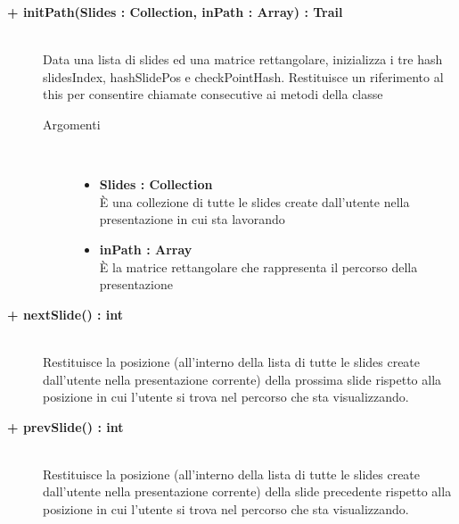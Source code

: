 \begin{description}
\begin{description}
\begin{description}
\begin{itemize}
				\end{itemize}
			
		\end{description}
	\end{description}
	
	\begin{description}
		\item[\textbf{\color{blue}+ initPath(Slides : Collection, inPath : Array) : Trail			}] \hfill \\
			Data una lista di slides ed una matrice rettangolare, inizializza i tre hash slidesIndex, hashSlidePos e checkPointHash.  Restituisce un riferimento al this per consentire chiamate consecutive ai metodi della classe
			
		\begin{description}
			\item[Argomenti] \hfill \\
				\begin{itemize}
				
					\item \textbf{Slides : Collection		} \hfill \\
					È una collezione di tutte le slides create dall'utente nella presentazione in cui sta lavorando
					\item \textbf{inPath :  Array		} \hfill \\
					È la matrice rettangolare che rappresenta il percorso della presentazione
					
				\end{itemize}
			
		\end{description}
	\end{description}
	
	\begin{description}
		\item[\textbf{\color{blue}+ nextSlide() : int			}] \hfill \\
			Restituisce la posizione (all'interno della lista di tutte le slides create dall'utente nella presentazione corrente) della prossima slide rispetto alla posizione in cui l'utente si trova nel percorso che sta visualizzando.
			
	\end{description}
	
	\begin{description}
		\item[\textbf{\color{blue}+ prevSlide() : int			}] \hfill \\
			Restituisce la posizione (all'interno della lista di tutte le slides create dall'utente nella presentazione corrente) della slide precedente rispetto alla posizione in cui l'utente si trova nel percorso che sta visualizzando.
			

\end{description}
\end{description}
